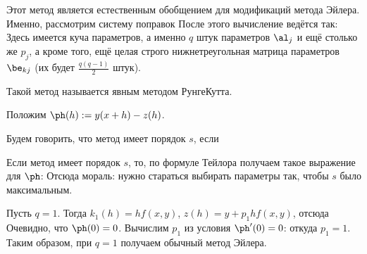\documentclass[a4paper]{article}
\begin{document}
Этот метод является естественным обобщением для модификаций метода Эйлера.
Именно, рассмотрим систему поправок
После этого вычисление ведётся так:
Здесь имеется куча параметров, а именно $q$ штук параметров $\al_j$ и ещё столько же $p_j$,
а кроме того, ещё целая строго нижнетреугольная матрица параметров $\be_{kj}$ (их будет $\frac{q(q-1)}{2}$ штук).

\begin{df}
Такой метод называется явным методом Рунге\ч Кутта.
\end{df}


Положим $\ph(h) := y(x+h) - z(h)$.

\begin{df}
Будем говорить, что метод имеет порядок $s$, если
\end{df}

Если метод имеет порядок $s$, то, по формуле Тейлора получаем такое выражение для $\ph$:
Отсюда мораль: нужно стараться выбирать параметры так, чтобы $s$ было максимальным.

\begin{ex}
Пусть $q = 1$. Тогда $k_1(h) = h f(x,y)$, $z(h) = y + p_1 hf(x,y)$, отсюда
Очевидно, что $\ph(0) = 0$. Вычислим $p_1$ из условия $\ph'(0) = 0$:
откуда $p_1 = 1$.
Таким образом, при $q = 1$ получаем обычный метод Эйлера.
\end{ex}
\end{document}
